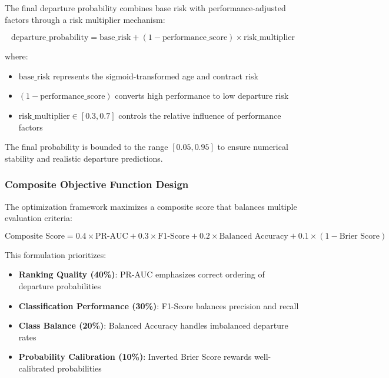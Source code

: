 The final departure probability combines base risk with performance-adjusted factors through a risk multiplier mechanism:

\begin{equation}
\text{departure\_probability} = \text{base\_risk} + (1 - \text{performance\_score}) \times \text{risk\_multiplier}
\end{equation}

where:
\begin{itemize}
    \item $\text{base\_risk}$ represents the sigmoid-transformed age and contract risk
    \item $(1 - \text{performance\_score})$ converts high performance to low departure risk
    \item $\text{risk\_multiplier} \in [0.3, 0.7]$ controls the relative influence of performance factors
\end{itemize}

The final probability is bounded to the range $[0.05, 0.95]$ to ensure numerical stability and realistic departure predictions.

\subsubsection{Composite Objective Function Design}

The optimization framework maximizes a composite score that balances multiple evaluation criteria:

\begin{equation}
\text{Composite Score} = 0.4 \times \text{PR-AUC} + 0.3 \times \text{F1-Score} + 0.2 \times \text{Balanced Accuracy} + 0.1 \times (1 - \text{Brier Score})
\end{equation}

This formulation prioritizes:
\begin{itemize}
    \item \textbf{Ranking Quality (40\%)}: PR-AUC emphasizes correct ordering of departure probabilities
    \item \textbf{Classification Performance (30\%)}: F1-Score balances precision and recall
    \item \textbf{Class Balance (20\%)}: Balanced Accuracy handles imbalanced departure rates
    \item \textbf{Probability Calibration (10\%)}: Inverted Brier Score rewards well-calibrated probabilities
\end{itemize}

